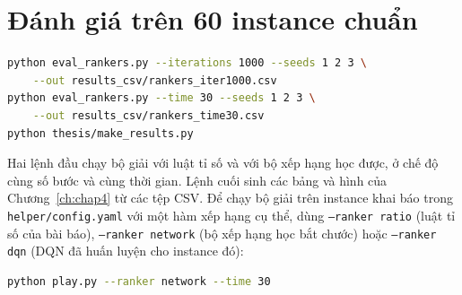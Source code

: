 \section{Đánh giá trên 60 instance chuẩn}

\begin{lstlisting}[language=bash]
python eval_rankers.py --iterations 1000 --seeds 1 2 3 \
    --out results_csv/rankers_iter1000.csv
python eval_rankers.py --time 30 --seeds 1 2 3 \
    --out results_csv/rankers_time30.csv
python thesis/make_results.py
\end{lstlisting}
Hai lệnh đầu chạy bộ giải với luật tỉ số và với bộ xếp hạng học được, ở chế độ cùng số bước và cùng thời gian. Lệnh cuối sinh các bảng và hình của Chương~\ref{ch:chap4} từ các tệp CSV. Để chạy bộ giải trên instance khai báo trong \texttt{helper/config.yaml} với một hàm xếp hạng cụ thể, dùng \texttt{--ranker ratio} (luật tỉ số của bài báo), \texttt{--ranker network} (bộ xếp hạng học bắt chước) hoặc \texttt{--ranker dqn} (DQN đã huấn luyện cho instance đó):
\begin{lstlisting}[language=bash]
python play.py --ranker network --time 30
\end{lstlisting}
